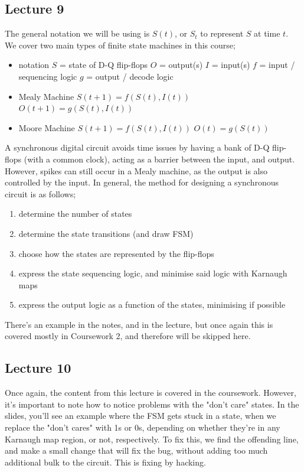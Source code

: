 \documentclass[a4paper, 12pt]{article}
\begin{document}
        \subsection*{Lecture 9}
            The general notation we will be using is $S(t)$, or $S_t$ to represent $S$ at time $t$. We cover two main types of finite state machines in this course;
            \begin{itemize}
                \itemsep0em
                \item notation
                    \subitem $S$ = state of D-Q flip-flops
                    \subitem $O$ = output(s)
                    \subitem $I$ = input(s)
                    \subitem $f$ = input / sequencing logic
                    \subitem $g$ = output / decode logic
                \item Mealy Machine
                    \subitem $S(t + 1) = f(S(t), I(t))$
                    \subitem $O(t + 1) = g(S(t), I(t))$
                \item Moore Machine
                    \subitem $S(t + 1) = f(S(t), I(t))$
                    \subitem $O(t) = g(S(t))$
            \end{itemize}
            A synchronous digital circuit avoids time issues by having a bank of D-Q flip-flops (with a common clock), acting as a barrier between the input, and output. However, spikes can still occur in a Mealy machine, as the output is also controlled by the input. In general, the method for designing a synchronous circuit is as follows;
            \begin{enumerate}[1.]
                \itemsep0em
                \item determine the number of states
                \item determine the state transitions (and draw FSM)
                \item choose how the states are represented by the flip-flops
                \item express the state sequencing logic, and minimise said logic with Karnaugh maps
                \item express the output logic as a function of the states, minimising if possible
            \end{enumerate}
            There's an example in the notes, and in the lecture, but once again this is covered mostly in Coursework 2, and therefore will be skipped here.
        \subsection*{Lecture 10}
            Once again, the content from this lecture is covered in the coursework. However, it's important to note how to notice problems with the "don't care" states. In the slides, you'll see an example where the FSM gets stuck in a state, when we replace the "don't cares" with 1s or 0s, depending on whether they're in any Karnaugh map region, or not, respectively. To fix this, we find the offending line, and make a small change that will fix the bug, without adding too much additional bulk to the circuit. This is fixing by hacking.
\end{document}

